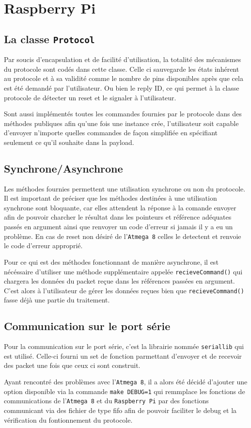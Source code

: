\section{Raspberry Pi}
\subsection{La classe \texttt{Protocol}}
Par soucis d'encapsulation et de facilité d'utilisation, la totalité des mécanismes du protocole sont codés dans cette classe.
Celle ci sauvegarde les états inhérent au protocole et à sa validité comme le nombre de pins disponibles après que cela est été demandé par l'utilisateur.
Ou bien le reply ID, ce qui permet à la classe protocole de détecter un reset et le signaler à l'utilisateur.

Sont aussi implémentés toutes les commandes fournies par le protocole dans des méthodes publiques afin qu'une fois une instance crée, l'utilisateur soit capable d'envoyer n'importe quelles commandes de façon simplifiée en spécifiant seulement ce qu'il souhaite dans la payload.

\subsection{Synchrone/Asynchrone}
Les méthodes fournies permettent une utilisation synchrone ou non du protocole.
Il est important de préciser que les méthodes destinées à une utilisation synchrone sont bloquante, car elles attendent la réponse à la comande envoyer afin de pouvoir charcher le résultat dans les pointeurs et référence adéquates passés en argument ainsi que renvoyer un code d'erreur si jamais il y a eu un problème. En cas de reset non désiré de l'\texttt{Atmega 8} celles le detectent et renvoie le code d'erreur approprié.

Pour ce qui est des méthodes fonctionnant de manière asynchrone, il est nécéssaire d'utiliser une méthode supplémentaire appelée \texttt{recieveCommand()} qui chargera les données du packet reçue dans les références passées en argument.
C'est alors à l'utilisateur de gérer les données reçues bien que \texttt{recieveCommand()} fasse déjà une partie du traitement.


\subsection{Communication sur le port série}
Pour la communication sur le port série, c'est la librairie nommée \texttt{seriallib} qui est utilisé. Celle-ci fourni un set de fonction parmettant d'envoyer et de recevoir des packet une fois que ceux ci sont construit.
 
Ayant rencontré des problèmes avec l'\texttt{Atmega 8}, il a alors été décidé d'ajouter une option disponible via la commande \texttt{make DEBUG=1} qui remmplace les fonctions de communications de l'\texttt{Atmega 8} et du \texttt{Raspberry Pi} par des fonctions communicant via des fichier de type fifo afin de pouvoir faciliter le debug et la vérification du fontionnement du protocole.
